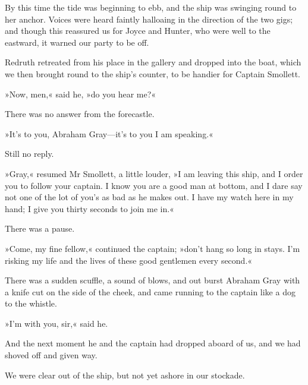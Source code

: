 By this time the tide was beginning to ebb, and the ship was swinging round to her anchor. Voices were heard faintly halloaing in the direction of the two gigs; and though this reassured us for Joyce and Hunter, who were well to the eastward, it warned our party to be off.

Redruth retreated from his place in the gallery and dropped into the boat, which we then brought round to the ship's counter, to be handier for Captain Smollett.

»Now, men,« said he, »do you hear me?«

There was no answer from the forecastle.

»It's to you, Abraham Gray—it's to you I am speaking.«

Still no reply.

»Gray,« resumed Mr Smollett, a little louder, »I am leaving this ship, and I order you to follow your captain. I know you are a good man at bottom, and I dare say not one of the lot of you's as bad as he makes out. I have my watch here in my hand; I give you thirty seconds to join me in.«

There was a pause.

»Come, my fine fellow,« continued the captain; »don't hang so long in stays. I'm risking my life and the lives of these good gentlemen every second.«

There was a sudden scuffle, a sound of blows, and out burst Abraham Gray with a knife cut on the side of the cheek, and came running to the captain like a dog to the whistle.

»I'm with you, sir,« said he.

And the next moment he and the captain had dropped aboard of us, and we had shoved off and given way.

We were clear out of the ship, but not yet ashore in our stockade.